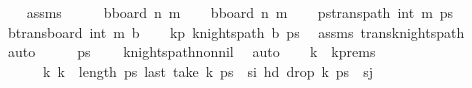 \begin{isabellebody}
%
\isadelimproof
\ \ %
\endisadelimproof
%
\isatagproof
{}\isamarkupfalse%
\ assms\isanewline
{}\isamarkupfalse%
\ {\isacharminus}{\kern0pt}\isanewline
\ \ \isamarkupfalse%
\ {\isacharquery}{\kern0pt}bboard\ n\ m\isanewline
\ \ \isamarkupfalse%
\ {\isacharquery}{\kern0pt}bboard\ n\ m\isanewline
\ \ \isamarkupfalse%
\ {\isacharquery}{\kern0pt}pstrans{\isacharunderscore}{\kern0pt}path\ {\isacharparenleft}{\kern0pt}{}{\isacharcomma}{\kern0pt}int\ m\ ps\isanewline
\ \ \isamarkupfalse%
\ {\isacharquery}{\kern0pt}b{\isacharprime}{\kern0pt}{\isacharequal}{\kern0pt}{\isachardoublequoteopen}trans{\isacharunderscore}{\kern0pt}board\ {\isacharparenleft}{\kern0pt}{}{\isacharcomma}{\kern0pt}int\ m\ {\isacharquery}{\kern0pt}b\isanewline
\ \ \isamarkupfalse%
\ kp{}{\isacharprime}{\kern0pt}{\isacharcolon}{\kern0pt}\ {\isachardoublequoteopen}knights{\isacharunderscore}{\kern0pt}path\ {\isacharquery}{\kern0pt}b{\isacharprime}{\kern0pt}\ {\isacharquery}{\kern0pt}ps\ \isamarkupfalse%
\ assms\ trans{\isacharunderscore}{\kern0pt}knights{\isacharunderscore}{\kern0pt}path\ \isamarkupfalse%
\ auto\isanewline
\ \ \isamarkupfalse%
\ \isamarkupfalse%
\ {\isachardoublequoteopen}{\isacharquery}{\kern0pt}ps\ {\isasymnoteq}\ {\isacharbrackleft}{\kern0pt}{\isacharbrackright}{\kern0pt}{\isachardoublequoteclose}\ \isamarkupfalse%
\ knights{\isacharunderscore}{\kern0pt}path{\isacharunderscore}{\kern0pt}non{\isacharunderscore}{\kern0pt}nil\ \isamarkupfalse%
\ auto\isanewline
\isanewline
\ \ \isamarkupfalse%
\ k\ \ k{\isacharunderscore}{\kern0pt}prems{\isacharcolon}{\kern0pt}\ \isanewline
\ \ \ \ {\isachardoublequoteopen}{}\ {\isacharless}{\kern0pt}\ k{\isachardoublequoteclose}\ {\isachardoublequoteopen}k\ {\isacharless}{\kern0pt}\ length\ ps\ {\isachardoublequoteopen}last\ {\isacharparenleft}{\kern0pt}take\ k\ ps\ {\isacharequal}{\kern0pt}\ s\isactrlsub i{\isachardoublequoteclose}\ {\isachardoublequoteopen}hd\ {\isacharparenleft}{\kern0pt}drop\ k\ ps\ {\isacharequal}{\kern0pt}\ s\isactrlsub j{\isachardoublequoteclose}\isanewline

\end{isabellebody}
